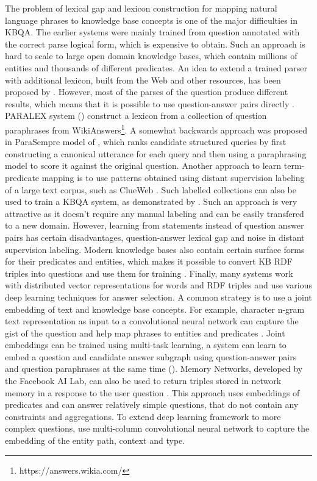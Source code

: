 The problem of lexical gap and lexicon construction for mapping natural language phrases to knowledge base concepts is one of the major difficulties in KBQA.
The earlier systems were mainly trained from question annotated with the correct parse logical form, which is expensive to obtain.
Such an approach is hard to scale to large open domain knowledge bases, which contain millions of entities and thousands of different predicates.
An idea to extend a trained parser with additional lexicon, built from the Web and other resources, has been proposed by \cite{CaiY13}.
However, most of the parses of the question produce different results, which means that it is possible to use question-answer pairs directly \cite{BerantCFL13:sempre}.
PARALEX system (\cite{fader2013paraphrase}) construct a lexicon from a collection of question paraphrases from WikiAnswers\footnote{https://answers.wikia.com/}.
A somewhat backwards approach was proposed in ParaSempre model of \cite{BerantL14:parasempre}, which ranks candidate structured queries by first constructing a canonical utterance for each query and then using a paraphrasing model to score it against the original question.
Another approach to learn term-predicate mapping is to use patterns obtained using distant supervision \cite{MintzBSJ09} labeling of a large text corpus, such as ClueWeb \cite{yao2014freebase}.
Such labelled collections can also be used to train a KBQA system, as demonstrated by \cite{ReddyLS14}.
Such an approach is very attractive as it doesn't require any manual labeling and can be easily transfered to a new domain.
However, learning from statements instead of question answer pairs has certain disadvantages, \eg question-answer lexical gap and noise in distant supervision labeling.
Modern knowledge bases also contain certain surface forms for their predicates and entities, which makes it possible to convert KB RDF triples into questions and use them for training \cite{BordesCW14:emnlp}.
Finally, many systems work with distributed vector representations for words and RDF triples and use various deep learning techniques for answer selection.
A common strategy is to use a joint embedding of text and knowledge base concepts.
For example, character n-gram text representation as input to a convolutional neural network can capture the gist of the question and help map phrases to entities and predicates \cite{yih2014semantic}.
Joint embeddings can be trained using multi-task learning, \eg a system can learn to embed a question and candidate answer subgraph using question-answer pairs and question paraphrases at the same time (\cite{BordesCW14:emnlp}).
Memory Networks, developed by the Facebook AI Lab, can also be used to return triples stored in network memory in a response to the user question \cite{bordes2015large}.
This approach uses embeddings of predicates and can answer relatively simple questions, that do not contain any constraints and aggregations.
To extend deep learning framework to more complex questions, \cite{dong2015question} use multi-column convolutional neural network to capture the embedding of the entity path, context and type.

